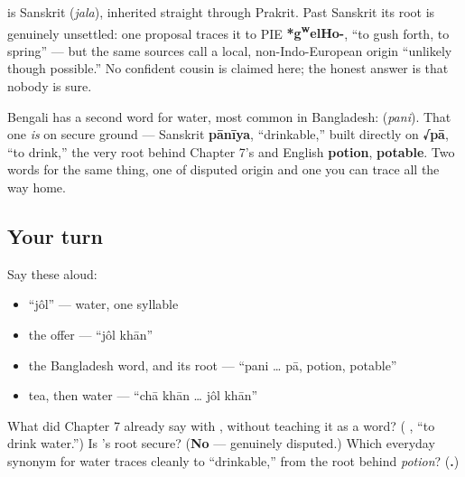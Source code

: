 \begin{cousinweb}
\textbf{} is Sanskrit \textbf{} (\emph{jala}), inherited straight through Prakrit. Past Sanskrit its root is genuinely unsettled: one proposal traces it to PIE \textbf{*g\textsuperscript{w}elHo-}, \textquotedblleft{}to gush forth, to spring\textquotedblright{} — but the same sources call a local, non-Indo-European origin \textquotedblleft{}unlikely though possible.\textquotedblright{} No confident cousin is claimed here; the honest answer is that nobody is sure.

Bengali has a second word for water, most common in Bangladesh: \textbf{} (\emph{pani}). That one \emph{is} on secure ground — Sanskrit \textbf{pānīya}, \textquotedblleft{}drinkable,\textquotedblright{} built directly on \textbf{√pā}, \textquotedblleft{}to drink,\textquotedblright{} the very root behind Chapter 7's \textbf{ } and English \textbf{potion}, \textbf{potable}. Two words for the same thing, one of disputed origin and one you can trace all the way home.
\end{cousinweb}

\subsection*{Your turn}
Say these aloud:

\begin{itemize}
\raggedright
  \item \textquotedblleft{}jôl\textquotedblright{} — water, one syllable
  \item the offer — \textquotedblleft{}jôl khān\textquotedblright{}
  \item the Bangladesh word, and its root — \textquotedblleft{}pani … pā, potion, potable\textquotedblright{}
  \item tea, then water — \textquotedblleft{}chā khān … jôl khān\textquotedblright{}
\end{itemize}

\begin{tcolorbox}[breakable,colback=teal!4,colframe=teal!35!black,title={Before you move on}]
What did Chapter 7 already say with , without teaching it as a word? (\textbf{ }, \textquotedblleft{}to drink water.\textquotedblright{}) Is 's root secure? (\textbf{No} — genuinely disputed.) Which everyday synonym for water traces cleanly to \textquotedblleft{}drinkable,\textquotedblright{} from the root behind \emph{potion}? (\textbf{.})
\end{tcolorbox}
